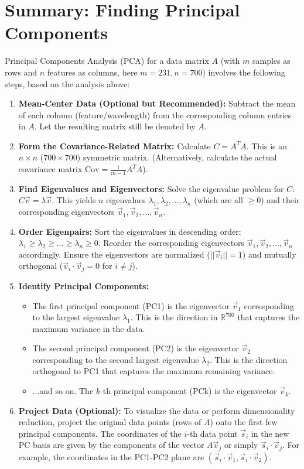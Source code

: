 \documentclass{report}
\begin{document}
\section{Summary: Finding Principal Components}

Principal Components Analysis (PCA) for a data matrix $A$ (with $m$ samples as rows and $n$ features as columns, here $m=231, n=700$) involves the following steps, based on the analysis above:

\begin{enumerate}
	\item \textbf{Mean-Center Data (Optional but Recommended):} Subtract the mean of each column (feature/wavelength) from the corresponding column entries in $A$. Let the resulting matrix still be denoted by $A$.
	\item \textbf{Form the Covariance-Related Matrix:} Calculate $C = A^T A$. This is an $n \times n$ ($700 \times 700$) symmetric matrix. (Alternatively, calculate the actual covariance matrix $\text{Cov} = \frac{1}{m-1} A^T A$).
	\item \textbf{Find Eigenvalues and Eigenvectors:} Solve the eigenvalue problem for $C$: $C \vec{v} = \lambda \vec{v}$. This yields $n$ eigenvalues $\lambda_1, \lambda_2, \dots, \lambda_n$ (which are all $\ge 0$) and their corresponding eigenvectors $\vec{v}_1, \vec{v}_2, \dots, \vec{v}_n$.
	\item \textbf{Order Eigenpairs:} Sort the eigenvalues in descending order: $\lambda_1 \ge \lambda_2 \ge \dots \ge \lambda_n \ge 0$. Reorder the corresponding eigenvectors $\vec{v}_1, \vec{v}_2, \dots, \vec{v}_n$ accordingly. Ensure the eigenvectors are normalized ($||\vec{v}_i||=1$) and mutually orthogonal ($\vec{v}_i \cdot \vec{v}_j = 0$ for $i \neq j$).
	\item \textbf{Identify Principal Components:}
	      \begin{itemize}
		      \item The first principal component (PC1) is the eigenvector $\vec{v}_1$ corresponding to the largest eigenvalue $\lambda_1$. This is the direction in $\mathbb{R}^{700}$ that captures the maximum variance in the data.
		      \item The second principal component (PC2) is the eigenvector $\vec{v}_2$ corresponding to the second largest eigenvalue $\lambda_2$. This is the direction orthogonal to PC1 that captures the maximum remaining variance.
		      \item ...and so on. The $k$-th principal component (PCk) is the eigenvector $\vec{v}_k$.
	      \end{itemize}
	\item \textbf{Project Data (Optional):} To visualize the data or perform dimensionality reduction, project the original data points (rows of $A$) onto the first few principal components. The coordinates of the $i$-th data point $\vec{s}_i$ in the new PC basis are given by the components of the vector $A \vec{v}_j$ or simply $\vec{s}_i \cdot \vec{v}_j$. For example, the coordinates in the PC1-PC2 plane are $(\vec{s}_i \cdot \vec{v}_1, \vec{s}_i \cdot \vec{v}_2)$.
\end{enumerate}
\end{document}
